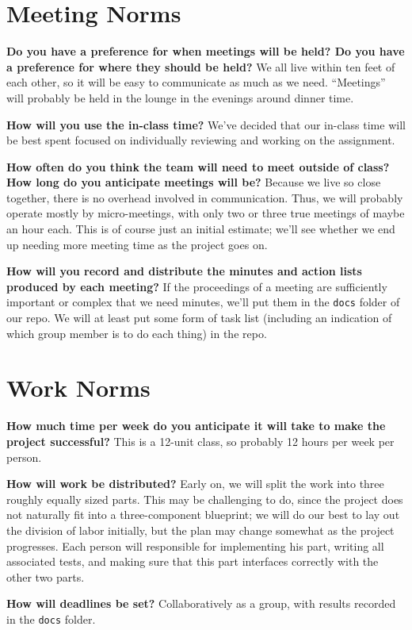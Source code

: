 \documentclass[11pt]{article}
\newcommand{\question}[2]{{\noindent\bf #1}\newline #2 \newline}
\begin{document}
\section{Meeting Norms}
\question{Do you have a preference for when meetings will be held? Do you have a preference for where they should be held?}{
We all live within ten feet of each other, so it will be easy to communicate as much as we need.  ``Meetings'' will probably be held in the lounge in the evenings around dinner time.}

\question{How will you use the in-class time?}{
We've decided that our in-class time will be best spent focused on individually reviewing and working on the assignment.}

\question{How often do you think the team will need to meet outside of class? How long do you anticipate meetings will be?}{
Because we live so close together, there is no overhead involved in communication.  Thus, we will probably operate mostly by micro-meetings, with only two or three true meetings of maybe an hour each.  This is of course just an initial estimate; we'll see whether we end up needing more meeting time as the project goes on.}

\question{How will you record and distribute the minutes and action lists produced by each meeting?}{
If the proceedings of a meeting are sufficiently important or complex that we need minutes, we'll put them in the \texttt{docs} folder of our repo.  We will at least put some form of task list (including an indication of which group member is to do each thing) in the repo.}

\section{Work Norms}
\question{How much time per week do you anticipate it will take to make the project successful?}{
This is a 12-unit class, so probably 12 hours per week per person.}

\question{How will work be distributed?}{
Early on, we will split the work into three roughly equally sized parts.  This may be challenging to do, since the project does not naturally fit into a three-component blueprint; we will do our best to lay out the division of labor initially, but the plan may change somewhat as the project progresses. Each person will responsible for implementing his part, writing all associated tests, and making sure that this part interfaces correctly with the other two parts.}

\question{How will deadlines be set?}{
Collaboratively as a group, with results recorded in the \texttt{docs} folder.}
\end{document}
